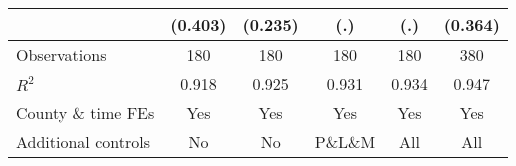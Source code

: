 {\begin{tabular}{l*{5}{c}}
                    &     (0.403)         &     (0.235)         &         (.)         &         (.)         &     (0.364)         \\
\hline
Observations        &         180         &         180         &         180         &         180         &         380         \\
\(R^{2}\)           &       0.918         &       0.925         &       0.931         &       0.934         &       0.947         \\
County \& time FEs  &         Yes         &         Yes         &         Yes         &         Yes         &         Yes         \\
Additional controls &          No         &          No         &     P\&L\&M         &         All         &         All         \\
\hline\hline
\end{tabular}
}
